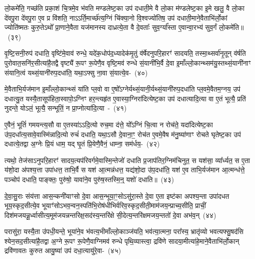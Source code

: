 लो॒कमे॑ति॒ गच्छ॑ति प्रका॒शं चि॒त्रमे॒व भ॑वति मण्डलेष्ट॒का उप॑ दधाती॒मे वै लो॒का म॑ण्डलेष्ट॒का इ॒मे खलु॒ वै लो॒का दे॑वपु॒रा दे॑वपु॒रा ए॒व प्र वि॑शति॒ नाऽऽर्ति॒मार्च्छ॑त्य॒ग्निं चि॑क्या॒नो वि॒श्वज्यो॑तिष॒ उप॑ दधाती॒माने॒वैताभि॑र्लो॒कां ज्योति॑ष्मतः कुरु॒ते\-ऽथो᳚ प्रा॒णाने॒वैता यज॑मानस्य दाध्रत्ये॒ता वै दे॒वताः᳚ सुव॒र्ग्या᳚स्ता ए॒वान्वा॒रभ्य॑ सुव॒र्गं लो॒कमे॑ति॥~(३९)\ip

{\anuvakamend[{सु॒व॒र्गमे॒व ता ए॒व च॒त्वारि॑ च}]}

वृ॒ष्टि॒सनी॒रुप॑ दधाति॒ वृष्टि॑मे॒वाव॑ रुन्धे॒ यदे॑क॒धोप॑द॒ध्यादेक॑मृ॒तुं व॑र्\mbox{}षेदनुपरि॒हारꣳ॑ सादयति॒ तस्मा॒थ्सर्वा॑नृ॒तून् व॑र्\mbox{}षति पुरोवात॒सनि॑र॒सीत्या॑है॒तद्वै वृष्ट्यै॑ रू॒पꣳ रू॒पेणै॒व वृष्टि॒मव॑ रुन्धे सं॒यानी॑भि॒र्वै दे॒वा इ॒माँल्लो॒कान्थ्सम॑यु॒स्तथ्सं॒यानी॑नाꣳ संयानि॒त्वं यथ्सं॒यानी॑रुप॒\-दधा॑ति॒ यथा॒\-ऽ\-फ्सु ना॒वा सं॒यात्ये॒व-~(४०)\ip

मे॒वैताभि॒र्यज॑मान इ॒माँल्लो॒कान्थ्सं या॑ति प्ल॒वो वा ए॒षो᳚\-ऽग्नेर्यथ्सं॒यानी॒र्यथ्सं॒यानी॑रुप॒\-दधा॑ति प्ल॒वमे॒वैतम॒ग्नय॒ उप॑ दधात्यु॒त यस्यै॒तासूप॑हिता॒स्वापो॒\-ऽग्निꣳ हर॒न्त्यहृ॑त ए॒वास्या॒ग्निरा॑दित्येष्ट॒का उप॑ दधात्यादि॒त्या वा ए॒तं भूत्यै॒ प्रति॑ नुदन्ते॒ यो\-ऽलं॒ भूत्यै॒ सन्भूतिं॒ न प्रा॒प्नोत्या॑दि॒त्या~-~(४१)\ip

ए॒वैनं॒ भूतिं॑ गमयन्त्य॒सौ वा ए॒तस्या॑ऽऽदि॒त्यो रुच॒मा द॑त्ते॒ यो᳚\-ऽग्निं चि॒त्वा न रोच॑ते॒ यदा॑दित्येष्ट॒का उ॑प॒दधा᳚त्य॒सावे॒वास्मि॑न्नादि॒त्यो रुचं॑ दधाति॒ यथा॒ऽसौ दे॒वाना॒ꣳ॒ रोच॑त ए॒वमे॒वैष म॑नु॒ष्या॑णाꣳ रोचते घृतेष्ट॒का उप॑ दधात्ये॒तद्वा अ॒ग्नेः प्रि॒यं धाम॒ यद् घृ॒तं प्रि॒येणै॒वैनं॒ धाम्ना॒ सम॑र्धय॒-~(४२)\ip

त्यथो॒ तेज॑सा\-ऽ\-नुपरि॒हारꣳ॑ सादय॒त्यप॑रिवर्गमे॒वास्मि॒न्तेजो॑ दधाति प्र॒जा\-प॑तिर॒ग्निम॑चिनुत॒ स यश॑सा॒ व्या᳚र्ध्यत॒ स ए॒ता य॑शो॒दा अ॑पश्य॒त्ता उपा॑धत्त॒ ताभि॒र्वै स यश॑ आ॒त्मन्न॑धत्त॒ यद्य॑शो॒दा उ॑प॒\-दधा॑ति॒ यश॑ ए॒व ताभि॒र्यज॑मान आ॒त्मन्ध॑त्ते॒ पञ्चोप॑ दधाति॒ पाङ्क्तः॒ पुरु॑षो॒ यावा॑ने॒व पुरु॑ष॒स्तस्मि॒न्॒ यशो॑ दधाति॥~(४३)\ip

{\anuvakamend[{ए॒वं प्रा॒प्नोत्या॑दि॒त्या अ॑र्धय॒त्येका॒न्नप॑ञ्चा॒शच्च॑}]}%

दे॒वा॒सु॒राः संय॑त्ता आस॒न्कनी॑याꣳसो दे॒वा आस॒न्भूया॒ꣳ॒सो\-ऽसु॑रा॒स्ते दे॒वा ए॒ता इष्ट॑का अपश्य॒न्ता उपा॑दधत भूय॒स्कृद॒सीत्ये॒व भूयाꣳ॑सो\-ऽभव॒न्वन॒स्पति॑भि॒रोष॑धीभिर्वरि\-व॒स्कृद॒सीती॒माम॑\-जय॒न्प्राच्य॒सीति॒ प्राचीं॒ दिश॑मजयन्नू॒र्ध्वासीत्य॒मूम॑जयन्नन्तरिक्ष॒सद॑स्य॒न्तरि॑क्षे सी॒देत्य॒न्तरि॑क्षमजय॒न्ततो॑ दे॒वा अभ॑व॒न्~(४४)\ip

परासु॑रा॒ यस्यै॒ता उ॑पधी॒यन्ते॒ भूया॑ने॒व भ॑वत्य॒भीमाँल्लो॒काञ्ज॑यति॒ भव॑त्या॒त्मना॒ परा᳚स्य॒ भ्रातृ॑व्यो भवत्यफ्सु॒षद॑सि श्येन॒सद॒सीत्या॑है॒तद्वा अ॒ग्ने रू॒पꣳ रू॒पेणै॒वाग्निमव॑ रुन्धे पृथि॒व्यास्त्वा॒ द्रवि॑णे सादया॒मीत्या॑हे॒माने॒वैताभि॑र्लो॒कान् द्रवि॑णावतः कुरुत आयु॒ष्या॑ उप॑ दधा॒त्यायु॑रे॒वा-~(४५)\ip

